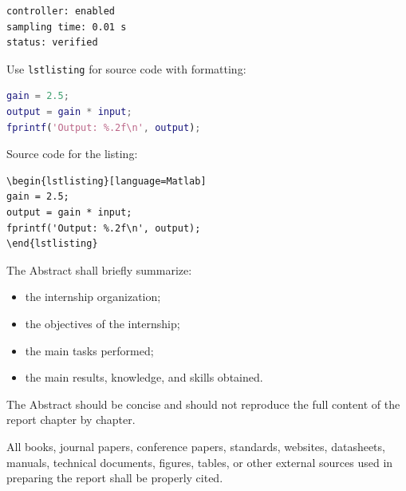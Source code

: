 {\begin{verbatim}
controller: enabled
sampling time: 0.01 s
status: verified
\end{verbatim}

Use \verb|lstlisting| for source code with formatting:

\begin{lstlisting}[language=Matlab]
gain = 2.5;
output = gain * input;
fprintf('Output: %.2f\n', output);
\end{lstlisting}

Source code for the listing:

\begin{verbatim}
\begin{lstlisting}[language=Matlab]
gain = 2.5;
output = gain * input;
fprintf('Output: %.2f\n', output);
\end{lstlisting}
\end{verbatim}


\noindent
{}

\vspace{0.15cm}

The Abstract shall briefly summarize:

\begin{itemize}[leftmargin=0.8cm, itemsep=2pt]
    \item the internship organization;
    \item the objectives of the internship;
    \item the main tasks performed;
    \item the main results, knowledge, and skills obtained.
\end{itemize}

The Abstract should be concise and should not reproduce the full content
of the report chapter by chapter.

\vspace{0.3cm}


\noindent
{}

\vspace{0.15cm}

All books, journal papers, conference papers, standards, websites,
datasheets, manuals, technical documents, figures, tables, or other
external sources used in preparing the report shall be properly cited.

}
